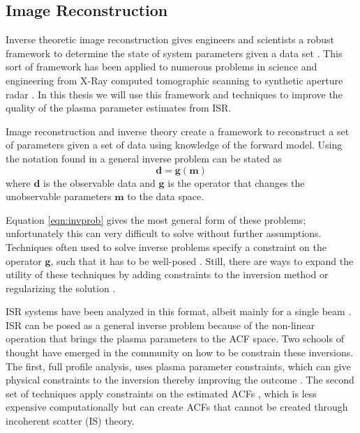 \subsection{Image Reconstruction}
\label{sec:imgrec}
Inverse theoretic image reconstruction gives engineers and scientists a robust framework to determine the state of system parameters given a data set \cite{menke2012geophysical,Vogel:2002:CMI:581830,Karl:2005jy}. This sort of framework has been applied to numerous problems in science and engineering from X-Ray computed tomographic scanning \cite{kak1988principles} to synthetic aperture radar \cite{1456966}. In this thesis we will use this framework and techniques to improve the quality of the plasma parameter estimates from ISR.

Image reconstruction and inverse theory create a framework to reconstruct a set of parameters given a set of data using knowledge of the forward model. Using the notation found in \cite{menke2012geophysical} a general inverse problem can be stated as
\begin{equation}
\label{eqn:invprob}
\mathbf{d}=\mathbf{g}(\mathbf{m})
\end{equation}
where $\mathbf{d}$ is the observable data and $\mathbf{g}$ is the operator that changes the unobservable parameters $\mathbf{m}$ to the data space. 

Equation \ref{eqn:invprob} gives the most general form of these problems; unfortunately this can very difficult to solve without further assumptions. Techniques often used to solve inverse problems specify a constraint on the operator $\mathbf{g}$, such that it has to be well-posed \cite{0266-5611-4-4-010}. Still, there are ways to expand the utility of these techniques by adding constraints to the inversion method or regularizing the solution \cite{Vogel:2002:CMI:581830,Karl:2005jy}.

ISR systems have been analyzed in this format, albeit mainly for a single beam \cite{Vierinen:2012ve}. ISR can be posed as a general inverse problem because of the non-linear operation that brings the plasma parameters to the ACF space. Two schools of thought have emerged in the community on how to be constrain these inversions. The first, full profile analysis, uses plasma parameter constraints, which can give physical constraints to the inversion thereby improving the outcome \cite{hysell2008,RDS:RDS3308}. The second set of techniques apply constraints on the estimated ACFs \cite{Virtanen:20082vx,nikoukar2008}, which is less expensive computationally but can create ACFs that cannot be created through incoherent scatter (IS) theory.

